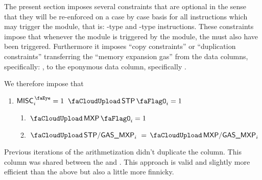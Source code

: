 The present section imposes several constraints that are optional in the sense that they will be re-enforced on a case by case basis for all instructions which may trigger the \stpMod{} module, that is: -type and -type instructions.
These constraints impose that whenever the \stpMod{} module is triggered by the \hubMod{} module, the \mxpMod{} must also have been triggered.
Furthermore it imposes ``copy constraints'' or ``duplication constraints'' transferring the ``memory expansion gas'' from the \mxpMod{} data columns, specifically: \miscMxpGasMxp{}, to the eponymous \stpMod{} data column, specifically \miscStpGasMxp{}.

We therefore impose that
\begin{enumerate}
	\item \If $\peekMisc _{i} = 1$ \et $\miscStpFlag _{i} = 1$ \Then
		\begin{enumerate}
			\item $\miscMxpFlag _{i} = 1$
			\item $\miscStpGasMxp _{i} = \miscMxpGasMxp _{i}$
		\end{enumerate}
\end{enumerate}
\saNote{}
Previous iterations of the \hubMod{} arithmetization didn't duplicate the \miscMxpGasMxp{} column.
This column was shared between the \mxpMod{} and \stpMod{}.
This approach is valid and slightly more efficient than the above but also a little more finnicky.
